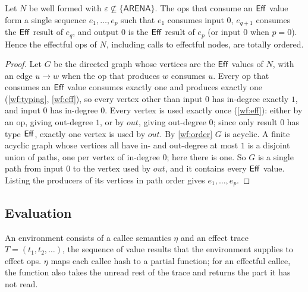 \begin{lemma}\label{lem:chain}
Let $N$ be well formed with $\varepsilon\not\subseteq\{\textsf{ARENA}\}$. The ops that consume
an $\mathsf{Eff}$ value form a single sequence $e_1,\dots,e_p$ such that $e_1$ consumes input $0$,
$e_{q+1}$ consumes the $\mathsf{Eff}$ result of $e_q$, and output $0$ is the $\mathsf{Eff}$ result of $e_p$
(or input $0$ when $p=0$). Hence the effectful ops of $N$, including calls to effectful nodes,
are totally ordered.
\end{lemma}
\begin{proof}
Let $G$ be the directed graph whose vertices are the $\mathsf{Eff}$ values of $N$, with an edge
$u\to w$ when the op that produces $w$ consumes $u$. Every op that consumes an $\mathsf{Eff}$ value
consumes exactly one and produces exactly one (\ref{wf:typing}, \ref{wf:eff}), so every vertex
other than input $0$ has in-degree exactly $1$, and input $0$ has in-degree $0$. Every vertex
is used exactly once (\ref{wf:eff}): either by an op, giving out-degree $1$, or by
$\mathit{out}$, giving out-degree $0$; since only result $0$ has type $\mathsf{Eff}$, exactly one
vertex is used by $\mathit{out}$. By \ref{wf:order} $G$ is acyclic. A finite acyclic graph
whose vertices all have in- and out-degree at most $1$ is a disjoint union of paths, one per
vertex of in-degree $0$; here there is one. So $G$ is a single path from input $0$ to the
vertex used by $\mathit{out}$, and it contains every $\mathsf{Eff}$ value. Listing the producers of
its vertices in path order gives $e_1,\dots,e_p$.
\end{proof}

\subsection{Evaluation}

\begin{definition}[Environment]\label{def:env}
An environment consists of a callee semantics $\eta$ and an effect trace $T=(t_1,t_2,\dots)$,
the sequence of value results that the environment supplies to effect ops. $\eta$ maps each
callee hash to a partial function; for an effectful callee, the function also takes the unread
rest of the trace and returns the part it has not read.
\end{definition}

